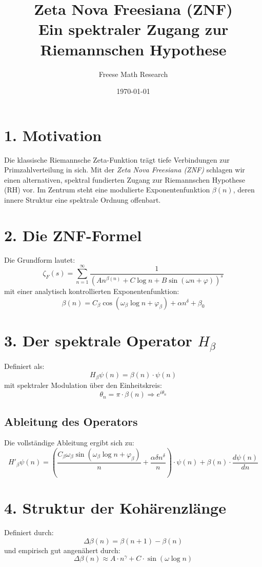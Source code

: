 \documentclass[11pt,a4paper]{article}
\title{\textbf{Zeta Nova Freesiana (ZNF)}\\Ein spektraler Zugang zur Riemannschen Hypothese}
\author{Freese Math Research}
\date{\today}
\begin{document}
\maketitle

\section*{1. Motivation}
Die klassische Riemannsche Zeta-Funktion trägt tiefe Verbindungen zur Primzahlverteilung in sich. Mit der \emph{Zeta Nova Freesiana (ZNF)} schlagen wir einen alternativen, spektral fundierten Zugang zur Riemannschen Hypothese (RH) vor. Im Zentrum steht eine modulierte Exponentenfunktion \(\beta(n)\), deren innere Struktur eine spektrale Ordnung offenbart.

\section*{2. Die ZNF-Formel}
Die Grundform lautet:
\[
\zeta_F(s) = \sum_{n=1}^{\infty} \frac{1}{\left(A n^{\beta(n)} + C \log n + B \sin(\omega n + \varphi) \right)^s}
\]
mit einer analytisch kontrollierten Exponentenfunktion:
\[
\beta(n) = C_\beta \cos(\omega_\beta \log n + \varphi_\beta) + \alpha n^\delta + \beta_0
\]

\section*{3. Der spektrale Operator \( H_\beta \)}
Definiert als:
\[
H_\beta \psi(n) = \beta(n) \cdot \psi(n)
\]
mit spektraler Modulation über den Einheitskreis:
\[
\theta_n = \pi \cdot \beta(n) \Rightarrow e^{i \theta_n}
\]

\subsection*{Ableitung des Operators}
Die vollständige Ableitung ergibt sich zu:
\[
H'_\beta \psi(n) = \left( \frac{C_\beta \omega_\beta \sin(\omega_\beta \log n + \varphi_\beta)}{n} + \frac{\alpha \delta n^\delta}{n} \right) \cdot \psi(n) + \beta(n) \cdot \frac{d\psi(n)}{dn}
\]

\section*{4. Struktur der Kohärenzlänge}
Definiert durch:
\[
\Delta \beta(n) = \beta(n+1) - \beta(n)
\]
und empirisch gut angenähert durch:
\[
\Delta \beta(n) \approx A \cdot n^\gamma + C \cdot \sin(\omega \log n)
\]
\end{document}
